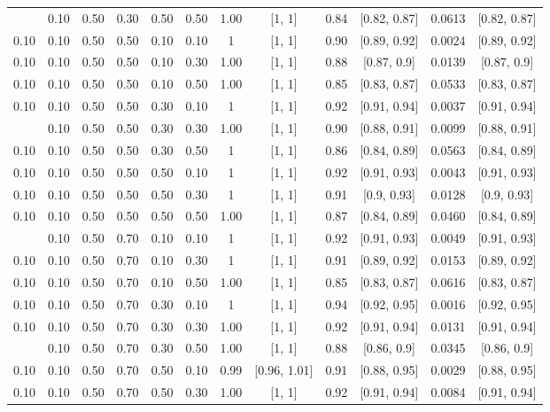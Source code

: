 \documentclass[
  11pt,
]{article}
\begin{document}
\begin{landscape}
\begin{ThreePartTable}
\begin{longtable}[t]{cccccccccccc}
\addlinespace
0.10 & 0.10 & 0.50 & 0.30 & 0.50 & 0.50 & 1.00 & {}[1, 1] & 0.84 & {}[0.82, 0.87] & 0.0613 & {}[0.82, 0.87]\\
0.10 & 0.10 & 0.50 & 0.50 & 0.10 & 0.10 & 1 & {}[1, 1] & 0.90 & {}[0.89, 0.92] & 0.0024 & {}[0.89, 0.92]\\
0.10 & 0.10 & 0.50 & 0.50 & 0.10 & 0.30 & 1.00 & {}[1, 1] & 0.88 & {}[0.87, 0.9] & 0.0139 & {}[0.87, 0.9]\\
0.10 & 0.10 & 0.50 & 0.50 & 0.10 & 0.50 & 1.00 & {}[1, 1] & 0.85 & {}[0.83, 0.87] & 0.0533 & {}[0.83, 0.87]\\
0.10 & 0.10 & 0.50 & 0.50 & 0.30 & 0.10 & 1 & {}[1, 1] & 0.92 & {}[0.91, 0.94] & 0.0037 & {}[0.91, 0.94]\\
\addlinespace
0.10 & 0.10 & 0.50 & 0.50 & 0.30 & 0.30 & 1.00 & {}[1, 1] & 0.90 & {}[0.88, 0.91] & 0.0099 & {}[0.88, 0.91]\\
0.10 & 0.10 & 0.50 & 0.50 & 0.30 & 0.50 & 1 & {}[1, 1] & 0.86 & {}[0.84, 0.89] & 0.0563 & {}[0.84, 0.89]\\
0.10 & 0.10 & 0.50 & 0.50 & 0.50 & 0.10 & 1 & {}[1, 1] & 0.92 & {}[0.91, 0.93] & 0.0043 & {}[0.91, 0.93]\\
0.10 & 0.10 & 0.50 & 0.50 & 0.50 & 0.30 & 1 & {}[1, 1] & 0.91 & {}[0.9, 0.93] & 0.0128 & {}[0.9, 0.93]\\
0.10 & 0.10 & 0.50 & 0.50 & 0.50 & 0.50 & 1.00 & {}[1, 1] & 0.87 & {}[0.84, 0.89] & 0.0460 & {}[0.84, 0.89]\\
\addlinespace
0.10 & 0.10 & 0.50 & 0.70 & 0.10 & 0.10 & 1 & {}[1, 1] & 0.92 & {}[0.91, 0.93] & 0.0049 & {}[0.91, 0.93]\\
0.10 & 0.10 & 0.50 & 0.70 & 0.10 & 0.30 & 1 & {}[1, 1] & 0.91 & {}[0.89, 0.92] & 0.0153 & {}[0.89, 0.92]\\
0.10 & 0.10 & 0.50 & 0.70 & 0.10 & 0.50 & 1.00 & {}[1, 1] & 0.85 & {}[0.83, 0.87] & 0.0616 & {}[0.83, 0.87]\\
0.10 & 0.10 & 0.50 & 0.70 & 0.30 & 0.10 & 1 & {}[1, 1] & 0.94 & {}[0.92, 0.95] & 0.0016 & {}[0.92, 0.95]\\
0.10 & 0.10 & 0.50 & 0.70 & 0.30 & 0.30 & 1.00 & {}[1, 1] & 0.92 & {}[0.91, 0.94] & 0.0131 & {}[0.91, 0.94]\\
\addlinespace
0.10 & 0.10 & 0.50 & 0.70 & 0.30 & 0.50 & 1.00 & {}[1, 1] & 0.88 & {}[0.86, 0.9] & 0.0345 & {}[0.86, 0.9]\\
0.10 & 0.10 & 0.50 & 0.70 & 0.50 & 0.10 & 0.99 & {}[0.96, 1.01] & 0.91 & {}[0.88, 0.95] & 0.0029 & {}[0.88, 0.95]\\
0.10 & 0.10 & 0.50 & 0.70 & 0.50 & 0.30 & 1.00 & {}[1, 1] & 0.92 & {}[0.91, 0.94] & 0.0084 & {}[0.91, 0.94]\\

\end{longtable}
\end{ThreePartTable}
\end{landscape}
\end{document}
